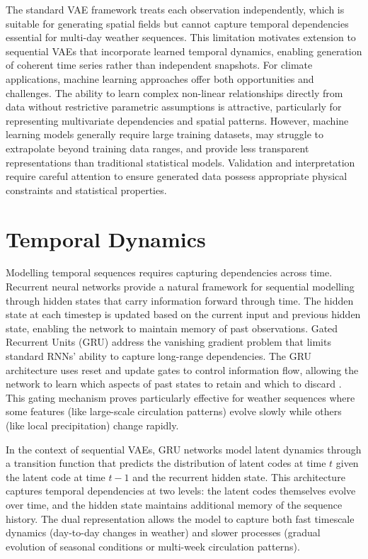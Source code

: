 The standard VAE framework treats each observation independently, which is suitable for 
generating spatial fields but cannot capture temporal dependencies essential for multi-day 
weather sequences. This limitation motivates extension to sequential VAEs that incorporate 
learned temporal dynamics, enabling generation of coherent time series rather than independent 
snapshots. For climate applications, machine learning approaches offer both opportunities and 
challenges. The ability to learn complex non-linear relationships directly from data without 
restrictive parametric assumptions is attractive, particularly for representing multivariate 
dependencies and spatial patterns. However, machine learning models generally require large 
training datasets, may struggle to extrapolate beyond training data ranges, and provide less 
transparent representations than traditional statistical models. Validation and interpretation 
require careful attention to ensure generated data possess appropriate physical constraints 
and statistical properties.

\section{Temporal Dynamics}

Modelling temporal sequences requires capturing dependencies across time. Recurrent neural 
networks provide a natural framework for 
sequential modelling through hidden states that carry information forward through time. The 
hidden state at each timestep is updated based on the current input and previous hidden state, 
enabling the network to maintain memory of past observations. Gated Recurrent Units (GRU) 
address the vanishing gradient problem that limits standard RNNs' ability to 
capture long-range dependencies. The GRU architecture uses reset and update gates to control 
information flow, allowing the network to learn which aspects of past states to retain and 
which to discard \cite{GRU}. This gating mechanism proves particularly effective for weather sequences 
where some features (like large-scale circulation patterns) evolve slowly while others (like 
local precipitation) change rapidly.

In the context of sequential VAEs, GRU networks model latent dynamics through a transition 
function that predicts the distribution of latent codes at time $t$ given the latent code at 
time $t-1$ and the recurrent hidden state. This architecture captures temporal dependencies at 
two levels: the latent codes themselves evolve over time, and the hidden state maintains 
additional memory of the sequence history. The dual representation allows the model to capture 
both fast timescale dynamics (day-to-day changes in weather) and slower processes (gradual 
evolution of seasonal conditions or multi-week circulation patterns).

